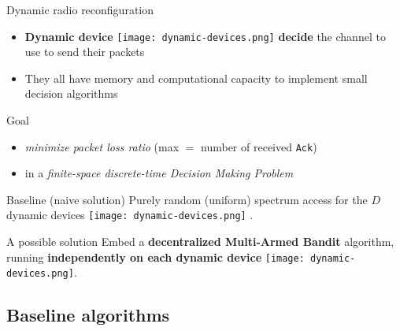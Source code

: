 \begin{frameO}
\begin{lightblock}{Dynamic radio reconfiguration}
        \begin{itemize}
            \item
                \textbf{Dynamic device} \texttt{[image: dynamic-devices.png]}  \textbf{decide} the channel to use to send their packets
            \item
                They all have memory and computational capacity to implement small decision algorithms
        \end{itemize}

    \end{lightblock}

\end{frameO}


\begin{frameO}[Problem]

    \begin{darkblock}{Goal}
        \begin{itemize}
            \item
            \emph{minimize packet loss ratio} (max \(=\) number of received \texttt{Ack})\\
            \item
            in a \emph{finite-space discrete-time Decision Making Problem}
        \end{itemize}
    \end{darkblock}

    \vspace*{20pt}

    \begin{colorblock}{Baseline (naive solution)}
        Purely random (uniform) spectrum access for the $D$ dynamic devices \texttt{[image: dynamic-devices.png]} .
    \end{colorblock}

    \begin{lightblock}{A possible solution}
        Embed a \textbf{decentralized Multi-Armed Bandit} algorithm, running \textbf{independently on each dynamic device} \texttt{[image: dynamic-devices.png]}.
    \end{lightblock}

\end{frameO}



\subsection{Baseline algorithms}

